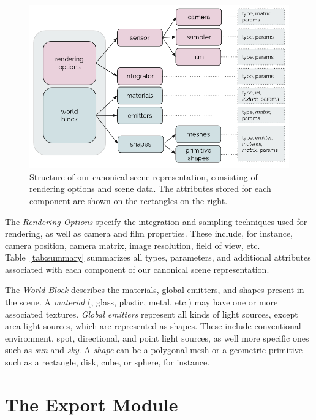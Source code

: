 \begin{figure}[h]
  \includegraphics[width=\textwidth,height=\textheight,keepaspectratio]{images/4_system_architecture/canonicalrep.png}
  \caption{Structure of our canonical scene representation, consisting of rendering options and scene data. The attributes stored for each component are shown on the rectangles on the right.}
  \label{fig:canonicalrep}
\end{figure}

The \textit{Rendering Options} specify the integration and sampling techniques used for rendering, as well as camera and film properties. These include, for instance, camera position, camera matrix, image resolution, field of view, etc. Table~\ref{tab:summary} summarizes all types, parameters, and additional attributes associated with each component of our canonical scene representation. 

The \textit{World Block} describes the materials, global emitters, and shapes present in the scene.
%
A {\it material} (\eg, glass, plastic, metal, etc.) may have one or more associated textures. {\it Global emitters} represent all kinds of light sources, except area light sources, which are represented as shapes. These include conventional environment, spot, directional, and point light sources, as well more specific ones such as {\it sun} and {\it sky}.
%
A {\it shape} can be a polygonal mesh or a geometric primitive such as a rectangle, disk, cube, or sphere, for instance. 



\section{The Export Module}

